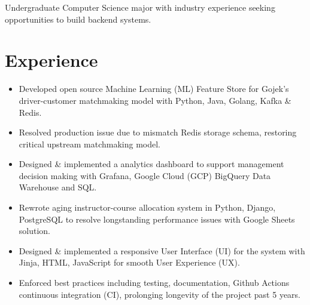 %
%

\fancyhead{} %


Undergraduate Computer Science major with industry experience seeking opportunities to build backend systems.

\section{Experience}
\begin{itemize}
  \item Developed open source Machine Learning (ML) Feature Store for Gojek's driver-customer matchmaking model with Python, Java, Golang, Kafka \& Redis.
  \item Resolved production issue due to mismatch Redis storage schema, restoring critical upstream matchmaking model.
  \item Designed \& implemented a analytics dashboard to support management decision making with Grafana, Google Cloud (GCP) BigQuery Data Warehouse and SQL.
\end{itemize}

\begin{itemize}
  \item Rewrote aging instructor-course allocation system in Python, Django, PostgreSQL to 
    resolve longstanding performance issues with Google Sheets solution.
  \item Designed \& implemented a responsive User Interface (UI)
    for the system with Jinja, HTML, JavaScript for smooth User Experience (UX).
  \item Enforced best practices including testing, documentation, Github Actions continuous integration (CI),
    prolonging longevity of the project past 5 years.
\end{itemize}

